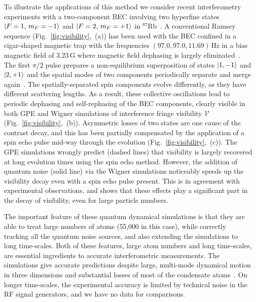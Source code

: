 \documentclass[aps,prl,twocolumn,showpacs,amsmath,amssymb,superscriptaddress,flushbottom,noraggedfooter]{revtex4-1}
\newcommand{\Rb}{$^{87}$Rb}
\newcommand{\figref}[1]{Fig.~\ref{#1}}
\newcommand{\ket}[1]{\mbox{\ensuremath{\vert #1 \rangle}}}
\begin{document}
To illustrate the applications of this method we consider recent interferometry
experiments with a two-component BEC involving two hyperfine states
${\ket{F=1,\, m_F=-1}}$ and ${\ket{F=2,\, m_F=+1}}$ in \Rb~\cite{Egorov2011}.
A conventional Ramsey sequence (\figref{fig:visibility},~(a)) has been used
with the BEC confined in a cigar-shaped magnetic trap with the frequencies $(97.0, 97.0, 11.69)\,\mathrm{Hz}$
in a bias magnetic field of $3.23\,\mathrm{G}$ where magnetic field dephasing is largely eliminated~\cite{Hall1998}.
The first $\pi/2$ pulse prepares a non-equilibrium superposition of states ${\ket{1,-1}}$ and ${\ket{2,+1}}$
and the spatial modes of two components periodically separate and merge again~\cite{Mertes2007}.
The spatially-separated spin components evolve differently, as they have
different scattering lengths.
As a result, these collective oscillations lead to periodic dephasing and
self-rephasing of the BEC components, clearly visible in both GPE and Wigner
simulations of interference fringe visibility
$\mathcal{V}$ (\figref{fig:visibility},~(b)).
Asymmetric losses of two states are one cause of the contrast decay, and
this has been partially compensated by the application of a spin echo pulse
mid-way through the evolution (\figref{fig:visibility},~(c)).
The GPE simulations wrongly predict (dashed lines) that visibility is largely
recovered at long evolution times using the spin echo method.
However, the addition of quantum noise (solid line) via the Wigner simulations
noticeably speeds up the visibility decay even with a spin echo pulse present.
This is in agreement with experimental observations, and shows that these
effects play a significant part in the decay of visibility, even for
large particle numbers.

The important feature of these quantum dynamical simulations
is that they are able to treat large numbers of atoms (55,000 in this case),
while correctly tracking all the quantum noise sources, and also extending the simulations to long time-scales.
Both of these features, large atom numbers and long time-scales,
are essential ingredients to accurate interferometric measurements.
The simulations give accurate predictions despite large, multi-mode dynamical motion in three dimensions
and substantial losses of most of the condensate atoms~\cite{Egorov2011}.
On longer time-scales, the experimental accuracy is limited by technical noise in the RF signal generators,
and we have no data for comparisons.
\end{document}
